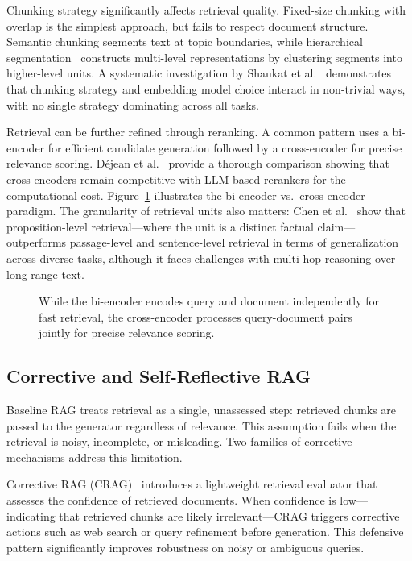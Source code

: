 Chunking strategy significantly affects retrieval quality. Fixed-size chunking with overlap is the simplest approach, but fails to respect document structure. Semantic chunking segments text at topic boundaries, while hierarchical segmentation~\cite{nguyen2025enhancingretrievalaugmentedgeneration} constructs multi-level representations by clustering segments into higher-level units. A systematic investigation by Shaukat et al.~\cite{shaukat2026systematicinvestigationdocumentchunking} demonstrates that chunking strategy and embedding model choice interact in non-trivial ways, with no single strategy dominating across all tasks.

Retrieval can be further refined through reranking. A common pattern uses a bi-encoder for efficient candidate generation followed by a cross-encoder for precise relevance scoring. Déjean et al.~\cite{dejean2024thoroughcomparisoncrossencodersllms} provide a thorough comparison showing that cross-encoders remain competitive with LLM-based rerankers for the computational cost. Figure~\ref{fig:cross_encoder} illustrates the bi-encoder vs.\ cross-encoder paradigm. The granularity of retrieval units also matters: Chen et al.~\cite{chen2024densexretrievalretrieval} show that proposition-level retrieval---where the unit is a distinct factual claim---outperforms passage-level and sentence-level retrieval in terms of generalization across diverse tasks, although it faces challenges with multi-hop reasoning over long-range text.

\begin{figure}[htbp]
\centering
{}
\caption{While the bi-encoder encodes query and document independently for fast retrieval, the cross-encoder processes query-document pairs jointly for precise relevance scoring.}
\label{fig:cross_encoder}
\end{figure}

\subsection{Corrective and Self-Reflective RAG}
\label{sec:rw:corrective_rag}

Baseline RAG treats retrieval as a single, unassessed step: retrieved chunks are passed to the generator regardless of relevance. This assumption fails when the retrieval is noisy, incomplete, or misleading. Two families of corrective mechanisms address this limitation.

Corrective RAG (CRAG)~\cite{yan2024correctiveretrievalaugmentedgeneration} introduces a lightweight retrieval evaluator that assesses the confidence of retrieved documents. When confidence is low---indicating that retrieved chunks are likely irrelevant---CRAG triggers corrective actions such as web search or query refinement before generation. This defensive pattern significantly improves robustness on noisy or ambiguous queries.

